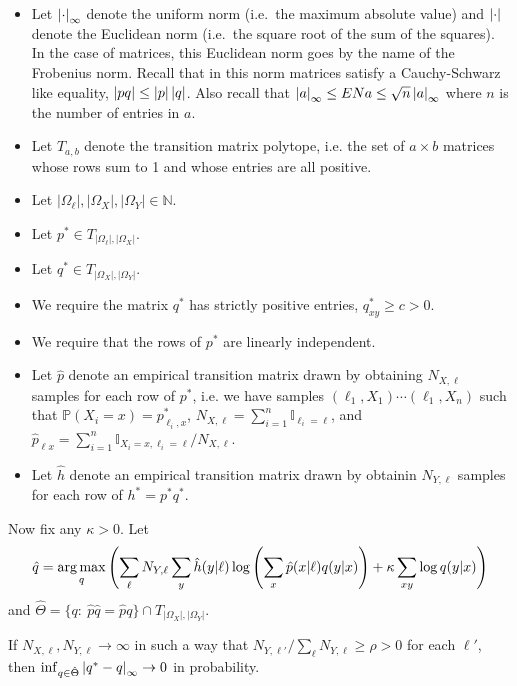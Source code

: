\begin{itemize}
\item Let $\left|\cdot\right|_\infty$ denote the uniform norm (i.e.\ the maximum absolute value) and $\left|\cdot\right|$ denote the Euclidean norm (i.e.\ the square root of the sum of the squares).  In the case of matrices, this Euclidean norm goes by the name of the Frobenius norm.  Recall that in this norm matrices satisfy a Cauchy-Schwarz like equality, $\left|pq\right|\leq\left|p\right|\left|q\right|$.  Also recall that $\left|a\right|_\infty \leq EN{a} \leq \sqrt{n}\left|a\right|_\infty$ where $n$ is the number of entries in $a$.
\item Let $T_{a,b}$ denote the transition matrix polytope, i.e. the set of $a\times b$ matrices whose rows sum to 1 and whose entries are all positive.
\item Let $|\Omega_\ell|,|\Omega_X|,|\Omega_Y| \in \mathbb{N}$.
\item Let $p^*\in T_{|\Omega_\ell|,|\Omega_X|}$.
\item Let $q^*\in T_{|\Omega_X|,|\Omega_Y|}$.
\item We require the matrix $q^*$ has strictly positive entries, $q^*_{xy}\geq c>0$.
\item We require that the rows of $p^*$ are linearly independent.  
\item Let $\hat p$ denote an empirical transition matrix drawn by obtaining $N_{X,\ell}$ samples for each row of $p^*$, i.e. we have samples $(\ell_1,X_1) \cdots (\ell_1,X_n)$ such that $\mathbb{P}(X_i=x) = p^*_{\ell_i,x}$, $N_{X,\ell}=\sum_{i=1}^n \mathbb{I}_{\ell_i=\ell}$, and $\hat p_{\ell x} = \sum_{i=1}^n \mathbb{I}_{X_i=x,\ell_i=\ell} / N_{X,\ell}$. 
\item Let $\hat h$ denote an empirical transition matrix drawn by obtainin $N_{Y,\ell}$ samples for each row of $h^*=p^*q^*$.  
\end{itemize}

Now fix any $\kappa>0$.  Let
\begin{align}
\hat q = \operatorname*{arg\,max}_q \left(\sum_\ell N_{Y,\ell}\sum_{y}\hat h(y|\ell)\log\left(\sum_{x}\hat p(x|\ell)q(y|x)\right) + \kappa \sum_{xy} \log q(y|x)\right)\label{eq:mindef}
\end{align}
and $\hat \Theta=\{q:\ \hat p\hat q=\hat pq\} \cap T_{|\Omega_X|,|\Omega_Y|}$.  
\vspace{.1in}
\begin{thm}
If $N_{X,\ell},N_{Y,\ell}\rightarrow \infty$ in such a way that $N_{Y,\ell'}/\sum_{\ell}N_{Y,\ell} \geq \rho>0$ for each $\ell'$, then $\inf_{q\in \hat\Theta} \left|q^*-q\right|_\infty\rightarrow 0$ in probability.
\end{thm}

